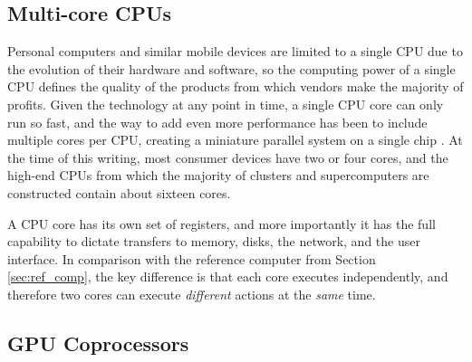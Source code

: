 \subsection{Multi-core CPUs}

Personal computers and similar mobile devices are limited
to a single CPU due to the evolution of their hardware and
software, so the computing power of a single CPU defines
the quality of the products from which vendors make
the majority of profits.
Given the technology at any point in time, a single CPU
core can only run so fast, and the way to add even more performance
has been to include multiple cores per CPU,
creating a miniature parallel system on a single chip
\cite{hennessy2011computer}.
At the time of this writing, most consumer devices
have two or four cores, and the high-end CPUs from
which the majority of clusters and supercomputers are constructed
contain about sixteen cores.

A CPU core has its own set of registers, and more importantly
it has the full capability to dictate transfers to memory,
disks, the network, and the user interface.
In comparison with the reference computer from Section \ref{sec:ref_comp},
the key difference is that each core executes independently,
and therefore two cores can execute \emph{different} actions
at the \emph{same} time.

\subsection{GPU Coprocessors}
\label{sec:def_gpu}

